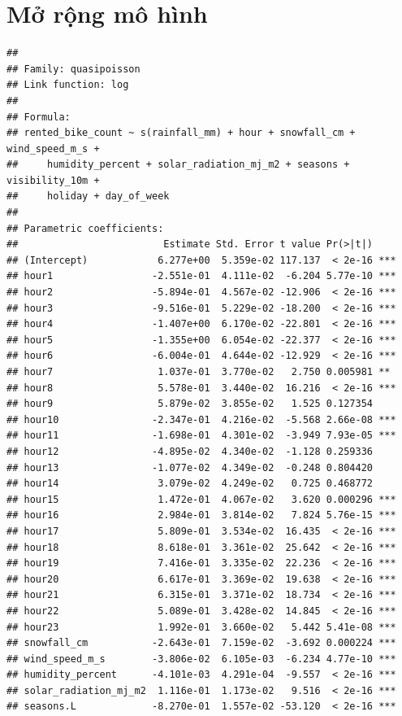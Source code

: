\documentclass[
  11pt,
  letterpaper,
]{article}
\begin{document}
\section{Mở rộng mô hình}

\begin{verbatim}
## 
## Family: quasipoisson 
## Link function: log 
## 
## Formula:
## rented_bike_count ~ s(rainfall_mm) + hour + snowfall_cm + wind_speed_m_s + 
##     humidity_percent + solar_radiation_mj_m2 + seasons + visibility_10m + 
##     holiday + day_of_week
## 
## Parametric coefficients:
##                         Estimate Std. Error t value Pr(>|t|)    
## (Intercept)            6.277e+00  5.359e-02 117.137  < 2e-16 ***
## hour1                 -2.551e-01  4.111e-02  -6.204 5.77e-10 ***
## hour2                 -5.894e-01  4.567e-02 -12.906  < 2e-16 ***
## hour3                 -9.516e-01  5.229e-02 -18.200  < 2e-16 ***
## hour4                 -1.407e+00  6.170e-02 -22.801  < 2e-16 ***
## hour5                 -1.355e+00  6.054e-02 -22.377  < 2e-16 ***
## hour6                 -6.004e-01  4.644e-02 -12.929  < 2e-16 ***
## hour7                  1.037e-01  3.770e-02   2.750 0.005981 ** 
## hour8                  5.578e-01  3.440e-02  16.216  < 2e-16 ***
## hour9                  5.879e-02  3.855e-02   1.525 0.127354    
## hour10                -2.347e-01  4.216e-02  -5.568 2.66e-08 ***
## hour11                -1.698e-01  4.301e-02  -3.949 7.93e-05 ***
## hour12                -4.895e-02  4.340e-02  -1.128 0.259336    
## hour13                -1.077e-02  4.349e-02  -0.248 0.804420    
## hour14                 3.079e-02  4.249e-02   0.725 0.468772    
## hour15                 1.472e-01  4.067e-02   3.620 0.000296 ***
## hour16                 2.984e-01  3.814e-02   7.824 5.76e-15 ***
## hour17                 5.809e-01  3.534e-02  16.435  < 2e-16 ***
## hour18                 8.618e-01  3.361e-02  25.642  < 2e-16 ***
## hour19                 7.416e-01  3.335e-02  22.236  < 2e-16 ***
## hour20                 6.617e-01  3.369e-02  19.638  < 2e-16 ***
## hour21                 6.315e-01  3.371e-02  18.734  < 2e-16 ***
## hour22                 5.089e-01  3.428e-02  14.845  < 2e-16 ***
## hour23                 1.992e-01  3.660e-02   5.442 5.41e-08 ***
## snowfall_cm           -2.643e-01  7.159e-02  -3.692 0.000224 ***
## wind_speed_m_s        -3.806e-02  6.105e-03  -6.234 4.77e-10 ***
## humidity_percent      -4.101e-03  4.291e-04  -9.557  < 2e-16 ***
## solar_radiation_mj_m2  1.116e-01  1.173e-02   9.516  < 2e-16 ***
## seasons.L             -8.270e-01  1.557e-02 -53.120  < 2e-16 ***

\end{verbatim}
\end{document}
